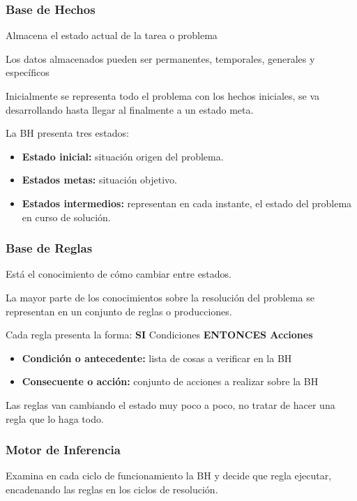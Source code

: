 \documentclass[12pt, twoside, openright]{report} %
\begin{document}
\subsubsection{Base de Hechos}
Almacena el estado actual de la tarea o problema

Los datos almacenados pueden ser permanentes, temporales, generales y específicos

Inicialmente se representa todo el problema con los hechos iniciales, se va desarrollando hasta llegar al finalmente a un estado meta.

La BH presenta tres estados:
\begin{itemize}
	\item \textbf{Estado inicial:} situación origen del problema.
	\item \textbf{Estados metas:} situación objetivo.
	\item \textbf{Estados intermedios:} representan en cada instante, el estado del problema en curso de solución.
\end{itemize}
\subsubsection{Base de Reglas}
Está el conocimiento de cómo cambiar entre estados.

La mayor parte de los conocimientos sobre la resolución del problema se representan en un conjunto de reglas o producciones.

Cada regla presenta la forma: \textbf{SI} Condiciones \textbf{ENTONCES Acciones}
\begin{itemize}
	\item \textbf{Condición o antecedente:} lista de cosas a verificar en la BH
	\item \textbf{Consecuente o acción:} conjunto de acciones a realizar sobre la BH
\end{itemize}

Las reglas van cambiando el estado muy poco a poco, no tratar de hacer una regla que lo haga todo.
\subsubsection{Motor de Inferencia}
Examina en cada ciclo de funcionamiento la BH y decide que regla ejecutar, encadenando las reglas en los ciclos de resolución.
\end{document}
